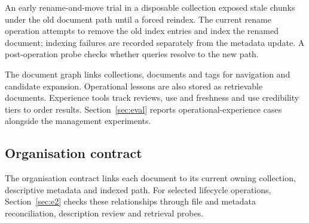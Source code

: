 An early rename-and-move trial in a disposable collection exposed stale
chunks under the old document path until a forced reindex. The current rename
operation attempts to remove the old index entries and index the renamed
document; indexing failures are recorded separately from the metadata update.
A post-operation probe checks whether queries resolve to the new path.

The document graph links collections, documents and tags for navigation and
candidate expansion. Operational lessons are also stored as retrievable
documents. Experience tools track reviews, use and freshness and use
credibility tiers to order results. Section~\ref{sec:eval} reports
operational-experience cases alongside the management experiments.

\subsection{Organisation contract}
\label{sec:org-integrity}
\label{sec:org-summary}

The organisation contract links each document to its current owning
collection, descriptive metadata and indexed path. For selected lifecycle
operations, Section~\ref{sec:e2} checks these relationships through file
and metadata reconciliation, description review and retrieval probes.
